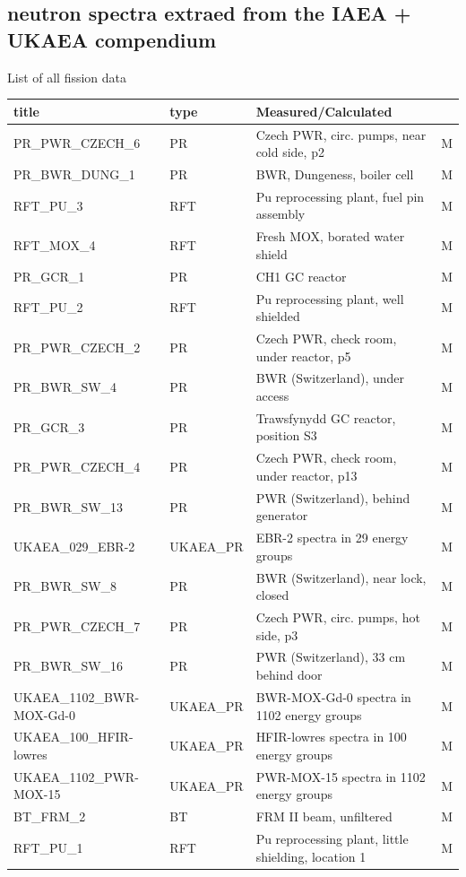 \documentclass[a4paper, 12pt]{article}
\begin{document}
\begin{appendices}
\section{neutron spectra extraed from the IAEA + UKAEA compendium}\label{fission-fusion spectra IAEAUKAEACompendium}
List of all fission data
\begin{longtable}{llll}
title & type &Measured/Calculated\\
\hline
PR\_PWR\_CZECH\_6 & PR & Czech PWR, circ. pumps, near cold side, p2  & M\\
PR\_BWR\_DUNG\_1 & PR & BWR, Dungeness, boiler cell  & M\\
RFT\_PU\_3 & RFT & Pu reprocessing plant, fuel pin assembly  & M\\
RFT\_MOX\_4 & RFT & Fresh MOX, borated water shield  & M\\
PR\_GCR\_1 & PR & CH1 GC reactor  & M\\
RFT\_PU\_2 & RFT & Pu reprocessing plant, well shielded  & M\\
PR\_PWR\_CZECH\_2 & PR & Czech PWR, check room, under reactor, p5  & M\\
PR\_BWR\_SW\_4 & PR & BWR (Switzerland), under access  & M\\
PR\_GCR\_3 & PR & Trawsfynydd GC reactor, position S3  & M\\
PR\_PWR\_CZECH\_4 & PR & Czech PWR, check room, under reactor, p13  & M\\
PR\_BWR\_SW\_13 & PR & PWR (Switzerland), behind generator  & M\\
UKAEA\_029\_EBR-2 & UKAEA\_PR & EBR-2 spectra in 29 energy groups & M\\
PR\_BWR\_SW\_8 & PR & BWR (Switzerland), near lock, closed  & M\\
PR\_PWR\_CZECH\_7 & PR & Czech PWR, circ. pumps, hot side, p3  & M\\
PR\_BWR\_SW\_16 & PR & PWR (Switzerland), 33 cm behind door  & M\\
UKAEA\_1102\_BWR-MOX-Gd-0 & UKAEA\_PR & BWR-MOX-Gd-0 spectra in 1102 energy groups & M\\
UKAEA\_100\_HFIR-lowres & UKAEA\_PR & HFIR-lowres spectra in 100 energy groups & M\\
UKAEA\_1102\_PWR-MOX-15 & UKAEA\_PR & PWR-MOX-15 spectra in 1102 energy groups & M\\
BT\_FRM\_2 & BT & FRM II beam, unfiltered  & M\\
RFT\_PU\_1 & RFT & Pu reprocessing plant, little shielding, location 1  & M\\

\end{longtable}
\end{appendices}
\end{document}

